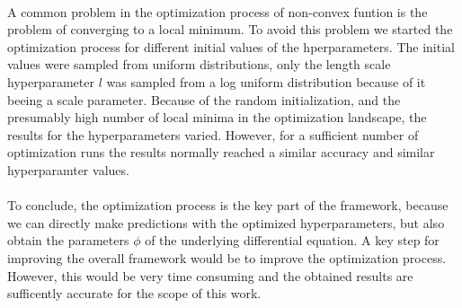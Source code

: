 \documentclass{article}
\begin{document}
\\
A common problem in the optimization process of non-convex funtion is the problem of converging to a local minimum. To avoid this problem we started the optimization process for different initial values of the hperparameters. The initial values were sampled from uniform distributions, only the length scale hyperparameter $l$ was sampled from a log uniform distribution because of it beeing a scale parameter. Because of the random initialization, and the presumably high number of local minima in the optimization landscape, the results for the hyperparameters varied. However, for a sufficient number of optimization runs the results normally reached a similar accuracy and similar hyperparamter values.\\
\\
To conclude, the optimization process is the key part of the framework, because we can directly make predictions with the optimized hyperparameters, but also obtain the parameters $\phi$ of the underlying differential equation. A key step for improving the overall framework would be to improve the optimization process. However, this would be very time consuming and the obtained results are sufficently accurate for the scope of this work.\\
\end{document}
